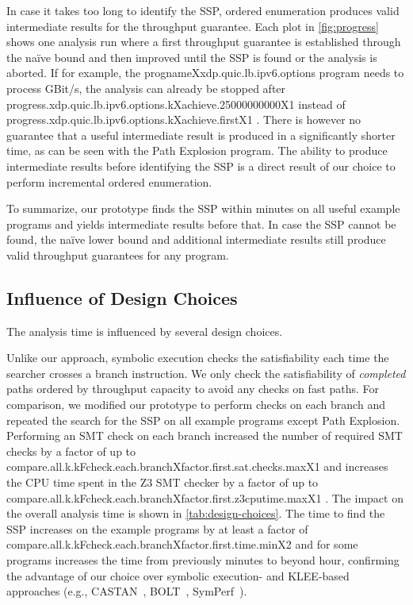 \documentclass[sigconf,screen,authordraft]{acmart}
\newcommand{\eg}{e.g.,}
\newcommand{\afblock}[1]{\noindent{\textbf{#1.}}}
\newcommand{\mdata}[3]{%
	\csname #1X#2X#3\endcsname%
}
\def\progname#1{\csname prognameX#1\endcsname}
\begin{document}
\afblock{Intermediate Results}
In case it takes too long to identify the \ac{SSP}, ordered enumeration produces valid intermediate results for the throughput guarantee.
Each plot in \ref{fig:progress} shows one analysis run where a first throughput guarantee is established through the naïve bound and then improved until the \ac{SSP} is found or the analysis is aborted.
If for example, the \progname{xdp.quic.lb.ipv6.options} program needs to process \unit[25]{GBit/s}, the analysis can already be stopped after \mdata{progress.xdp.quic.lb.ipv6.options.k}{achieve.25000000000}{1} instead of \mdata{progress.xdp.quic.lb.ipv6.options.k}{achieve.first}{1}.
There is however no guarantee that a useful intermediate result is produced in a significantly shorter time, as can be seen with the Path Explosion program.
The ability to produce intermediate results before identifying the \ac{SSP} is a direct result of our choice to perform incremental ordered enumeration.

To summarize, our prototype finds the \ac{SSP} within minutes on all useful example programs and yields intermediate results before that.
In case the \ac{SSP} cannot be found, the naïve lower bound and additional intermediate results still produce valid throughput guarantees for any program.


\subsection{Influence of Design Choices}
\label{subsec:eval-design-choices}

The analysis time is influenced by several design choices.

\afblock{Satisfiability Checking}
Unlike our approach, symbolic execution checks the satisfiability each time the searcher crosses a branch instruction.
We only check the satisfiability of \emph{completed} paths ordered by throughput capacity to avoid any checks on fast paths.
For comparison, we modified our prototype to perform checks on each branch and repeated the search for the \ac{SSP} on all example programs except Path Explosion.
Performing an \ac{SMT} check on each branch increased the number of required \ac{SMT} checks by a factor of up to \mdata{compare.all.k.kFcheck.each.branch}{factor.first.sat.checks.max}{1} and increases the CPU time spent in the Z3 \ac{SMT} checker by a factor of up to \mdata{compare.all.k.kFcheck.each.branch}{factor.first.z3cputime.max}{1}.
The impact on the overall analysis time is shown in \ref{tab:design-choices}.
The time to find the \ac{SSP} increases on the example programs by at least a factor of \mdata{compare.all.k.kFcheck.each.branch}{factor.first.time.min}{2} and for some programs increases the time from previously minutes to beyond \unit[1]{hour}, confirming the advantage of our choice over symbolic execution- and KLEE-based approaches (\eg{} CASTAN~\cite{castan}, BOLT~\cite{BOLT}, SymPerf~\cite{symperf}).
\end{document}
